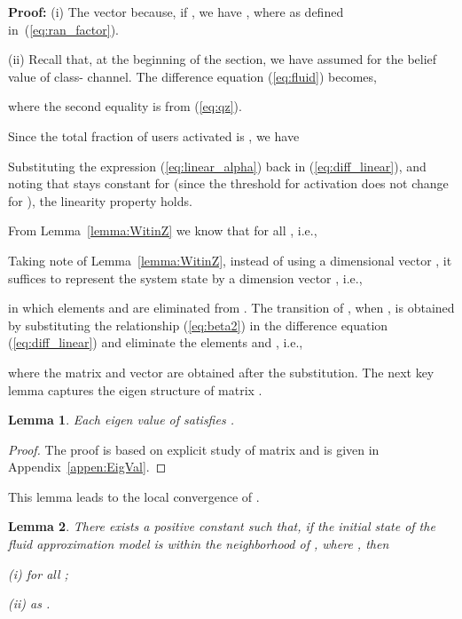 \documentclass[11pt,twocolumn]{IEEEtran}
\newtheorem{lemma}{Lemma}
\begin{document}
\noindent \textbf{Proof:}
(i) The vector   because, if , we have , where  as defined in~(\ref{eq:ran_factor}).
\vspace{3pt}

(ii) Recall that, at the beginning of the section, we have assumed  for the belief value  of class- channel. The difference equation (\ref{eq:fluid}) becomes,

where the second equality is from (\ref{eq:qz}).

Since the total fraction of users activated is , we have


Substituting the expression (\ref{eq:linear_alpha}) back in (\ref{eq:diff_linear}), and noting that  stays constant for  (since the threshold  for activation does not change for ), the linearity property holds. \hfill 

\vspace{10pt}



From Lemma~\ref{lemma:WitinZ} we know that  for all , i.e.,


Taking note of Lemma~\ref{lemma:WitinZ}, instead of using a  dimensional vector , it suffices to represent the system state by a  dimension vector , i.e.,

in which elements  and  are eliminated from . The transition of , when , is obtained by substituting the relationship (\ref{eq:beta2}) in the difference equation (\ref{eq:diff_linear}) and eliminate the elements  and , i.e.,

where the matrix  and vector  are obtained after the substitution.
The next key lemma captures the eigen structure of matrix .

\begin{lemma}
\label{lemma:EigVal}
Each eigen value  of  satisfies .
\end{lemma}

\begin{proof}
The proof is based on explicit study of matrix  and is given in Appendix~\ref{appen:EigVal}.
\end{proof}
\vspace{4pt}

This lemma leads to the local convergence of .

\begin{lemma}
\label{prof:fluid_conv}
There exists a positive constant  such that, if the initial state  of the fluid approximation model is within the  neighborhood  of , where , then
\vspace{4pt}

(i)  for all ;

(ii)  as .
\end{lemma}
\end{document}
